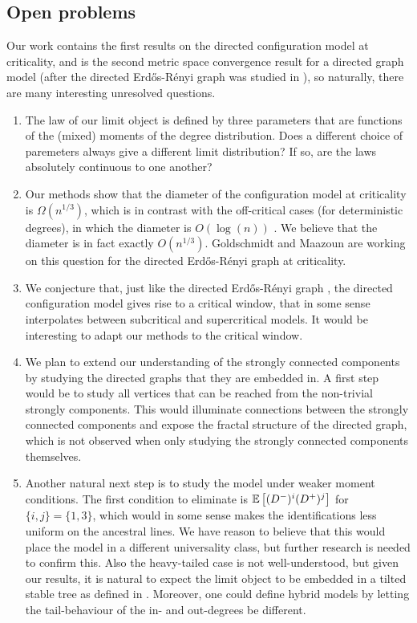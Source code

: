 \subsection{Open problems}
Our work contains the first results on the directed configuration model at criticality, and is the second metric space convergence result for a directed graph model (after the directed Erd\H{o}s-Rényi graph was studied in \cite{goldschmidtScalingLimitCritical2019}), so naturally, there are many interesting unresolved questions.
\begin{enumerate}
    \item The law of our limit object is defined by three parameters that are functions of the (mixed) moments of the degree distribution. Does a different choice of paremeters always give a different limit distribution? If so, are the laws absolutely continuous to one another?
    \item Our methods show that the diameter of the configuration model at criticality is  $\Omega(n^{1/3})$, which is in contrast with the off-critical cases (for deterministic degrees), in which the diameter is $O(\log(n))$ \cite{caiDiameterDirectedConfiguration2020}. We believe that the diameter is in fact exactly $O(n^{1/3})$. Goldschmidt and Maazoun are working on this question for the directed Erd\H{o}s-Rényi graph at criticality. 
     \item We conjecture that, just like the directed Erd\H{o}s-Rényi graph \cite{goldschmidtScalingLimitCritical2019}, the directed configuration model gives rise to a critical window, that in some sense interpolates between subcritical and supercritical models. It would be interesting to adapt our methods to the critical window.
     \item We plan to extend our understanding of the strongly connected components by studying the directed graphs that they are embedded in. A first step would be to study all vertices that can be reached from the non-trivial strongly components. This would illuminate connections between the strongly connected components and expose the fractal structure of the directed graph, which is not observed when only studying the strongly connected components themselves.
    \item Another natural next step is to study the model under weaker moment conditions. The first condition to eliminate is ${\mathbb E}\left[(D^-)^i(D^+)^j\right]$ for $\{i,j\}=\{1,3\}$, which would in some sense makes the identifications less uniform on the ancestral lines. We have reason to believe that this would place the model in  a different universality class, but further research is needed to confirm this. Also the heavy-tailed case is not well-understood, but given our results, it is natural to expect the limit object to be embedded in a tilted stable tree as defined in \cite{conchon--kerjanStableGraphMetric2020}. Moreover, one could define hybrid models by letting the tail-behaviour of the in- and out-degrees be different. 

\end{enumerate}

